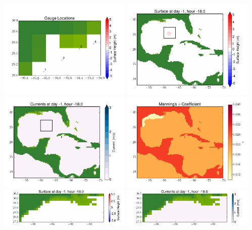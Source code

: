 \documentclass[11pt]{article}
\begin{document}
\includegraphics[width=0.475\textwidth]{frame0029fig10.png}
\vskip 10pt 
\includegraphics[width=0.475\textwidth]{frame0030fig1.png}
\includegraphics[width=0.475\textwidth]{frame0030fig2.png}
\vskip 10pt 
\includegraphics[width=0.475\textwidth]{frame0030fig3.png}
\includegraphics[width=0.475\textwidth]{frame0030fig4.png}
\vskip 10pt 
\includegraphics[width=0.475\textwidth]{frame0030fig5.png}
\end{document}
